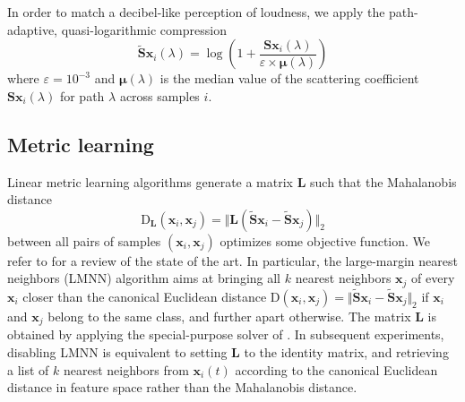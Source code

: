 In order to match a decibel-like perception of loudness, we apply the path-adaptive, quasi-logarithmic compression
\begin{equation}
\widetilde{\mathbf{S}} \boldsymbol{x}_i(\lambda) =
\log \left(
1 + \dfrac{\mathbf{S}\boldsymbol{x}_i(\lambda)}{\varepsilon \times \boldsymbol{\mu}(\lambda)}
\right)
\end{equation}
where $\varepsilon = 10^{-3}$ and $\boldsymbol{\mu}(\lambda)$ is the median value of the scattering coefficient $\mathbf{S}\boldsymbol{x}_i (\lambda)$ for path $\lambda$ across samples $i$.


\subsection{Metric learning} %
Linear metric learning algorithms generate a matrix $\mathbf{L}$ such that the Mahalanobis distance
\begin{equation}
\mathrm{D}_\mathbf{L}(\boldsymbol{x}_i, \boldsymbol{x}_j) = \Vert \mathbf{L} (\widetilde{\mathbf{S}}\boldsymbol{x}_i-\widetilde{\mathbf{S}}\boldsymbol{x}_j) \Vert_2
\end{equation}
between all pairs of samples $(\boldsymbol{x}_i, \boldsymbol{x}_j)$ optimizes some objective function.
We refer to \cite{bellet2013survey} for a review of the state of the art.
In particular, the large-margin nearest neighbors (LMNN) algorithm aims at bringing all $k$ nearest neighbors $\boldsymbol{x}_j$ of every $\boldsymbol{x}_i$ closer than the canonical Euclidean distance $\mathrm{D}(\boldsymbol{x}_i, \boldsymbol{x}_j) = \Vert \widetilde{\mathbf{S}}\boldsymbol{x}_i - \widetilde{\mathbf{S}}\boldsymbol{x}_j \Vert_2$ if $\boldsymbol{x}_i$ and $\boldsymbol{x}_j$ belong to the same class, and further apart otherwise.
The matrix $\mathbf{L}$ is obtained by applying the special-purpose solver of \cite[appendix A]{weinberger2009jmlr}.
In subsequent experiments, disabling LMNN is equivalent to setting $\mathbf{L}$ to the identity matrix, and retrieving a list of $k$ nearest neighbors from $\boldsymbol{x}_i (t)$ according to the canonical Euclidean distance in feature space rather than the Mahalanobis distance.

